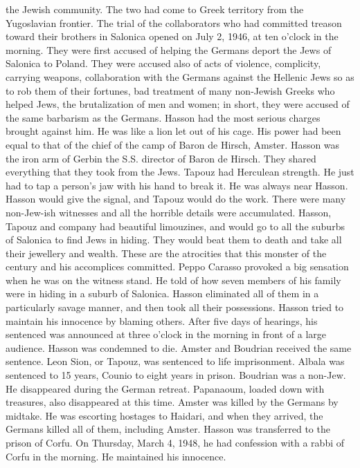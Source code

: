the Jewish community.
The two had come to Greek territory from the Yugoslavian frontier.
The trial of the collaborators who had committed treason toward 
their brothers in Salonica opened on July 2, 1946, at ten o'clock in the 
morning.
They were first accused of helping the Germans deport the Jews 
of Salonica to Poland.
They were accused also of acts of violence, complicity, carrying weapons, collaboration with the Germans against the 
Hellenic Jews so as to rob them of their fortunes, bad treatment of many 
non-Jewish Greeks who helped Jews, the brutalization of men and women; 
in short, they were accused of the same barbarism as the Germans.
Hasson had the most serious charges brought against him.
He was like a lion let out of his cage.
His power had been equal to that of the chief of
the camp of Baron de Hirsch, Amster.
Hasson was the iron arm of Gerbin 
the S.S.
director of Baron de Hirsch.
They shared everything that they 
took from the Jews.
Tapouz had Herculean strength.
He just had to tap a person's jaw 
with his hand to break it.
He was always near Hasson.
Hasson would 
give the signal, and Tapouz would do the work.
There were many non-Jew-ish witnesses and all the horrible details were accumulated.
Hasson, Tapouz and company had beautiful limouzines, and would go to all the suburbs of Salonica to find Jews in hiding.
They would beat them to death 
and take all their jewellery and wealth.
These are the atrocities that 
this monster of the century and his accomplices committed.
Peppo Carasso provoked a big sensation when he was on the witness 
stand.
He told of how seven members of his family were in hiding in a 
suburb of Salonica.
Hasson eliminated all of them in a particularly savage manner, and then took all their possessions.
Hasson tried to maintain his innocence by blaming others.
After 
five days of hearings, his sentenced was announced at three o'clock in 
the morning in front of a large audience.
Hasson was condemned to die.
Amster and Boudrian received the same sentence.
Leon Sion, or Tapouz, 
was sentenced to life imprisonment.
Albala was sentenced to 15 years, 
Counio to eight years in prison.
Boudrian was a non-Jew.
He disappeared during the German retreat.
Papanaoum, loaded down with treasures, 
also disappeared at this time.
Amster was killed by the Germans by midtake.
He was escorting hostages to Haidari, and when they arrived, the 
Germans killed all of them, including Amster.
Hasson was transferred to the prison of Corfu.
On Thursday, March 
4, 1948, he had confession with a rabbi of Corfu in the morning.
He 
maintained his innocence.

